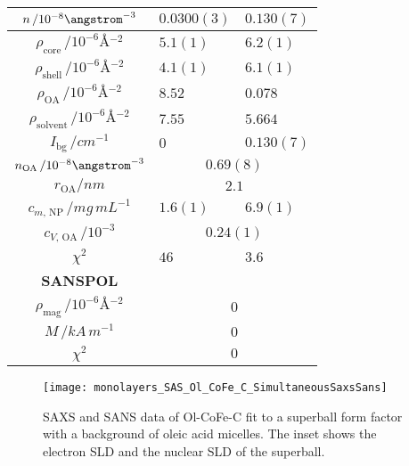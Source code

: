 \documentclass[\main/dresen_thesis.tex]{subfiles}
\begin{document}
\begin{table}[!htbp]
\begin{tabular}{ c | l | l }
        \hline
        \rule{0pt}{2ex} $n \, / 10^{-8} \angstrom^{-3}$                              & $0.0300(3)$     & $0.130(7)$\\
        \hline
        \rule{0pt}{2ex} $\rho_\mathrm{core}    \, / \unit{10^{-6} \angstrom^{-2}}$   & $5.1(1)$ & $6.2(1)$\\
        \rule{0pt}{2ex} $\rho_\mathrm{shell}   \, / \unit{10^{-6} \angstrom^{-2}}$   & $4.1(1)$ & $6.1(1)$\\
        \rule{0pt}{2ex} $\rho_\mathrm{OA}      \, / \unit{10^{-6} \angstrom^{-2}}$   & $8.52$   & $0.078$\\
        \rule{0pt}{2ex} $\rho_\mathrm{solvent} \, / \unit{10^{-6} \angstrom^{-2}}$   & $7.55$   & $5.664$\\
        \rule{0pt}{2ex} $I_\mathrm{bg} \, / \unit{cm^{-1}}$                          & $0$      & $0.130(7)$\\
        \hline
        \rule{0pt}{2ex} $n_\mathrm{OA} \, / 10^{-8} \angstrom^{-3}$                  & \multicolumn{2}{c}{$0.69(8)$}\\
        \rule{0pt}{2ex} $r_\mathrm{OA} / \unit{nm}$                                  & \multicolumn{2}{c}{$2.1$}\\
        \hline
        \rule{0pt}{2ex} $c_{m, \, \mathrm{NP}} \, / \unit{mg\, mL^{-1}}$             & $1.6(1)$  & $6.9(1)$\\
        \rule{0pt}{2ex} $c_{V, \, \mathrm{OA}} \, / \unit{10^{-3}}$                  & \multicolumn{2}{c}{$0.24(1)$}\\
        \hline
        \rule{0pt}{2ex} $\chi^2$                                                     & $46$     & $3.6$\\
        \hline
        \textbf{SANSPOL}\\
        \hline
        \rule{0pt}{2ex} $\rho_\mathrm{mag} \, / \unit{10^{-6} \angstrom^{-2}}$       & \multicolumn{2}{c}{$0$}\\
        \rule{0pt}{2ex} $M \, / \unit{kA \,m^{-1}}$                                  & \multicolumn{2}{c}{$0$}\\
        \hline
        \rule{0pt}{2ex} $\chi^2$                                                     & \multicolumn{2}{c}{$0$}\\
      \end{tabular}
    \end{table}


    \begin{figure}[tb]
      \centering
      \texttt{[image: monolayers\_SAS\_Ol\_CoFe\_C\_SimultaneousSaxsSans]}
      \caption{\label{fig:monolayers:nanoparticle:sas:OlCoFeC}SAXS and SANS data of Ol-CoFe-C fit to a superball form factor with a background of oleic acid micelles. The inset shows the electron SLD and the nuclear SLD of the superball. }
    \end{figure}
\end{document}

